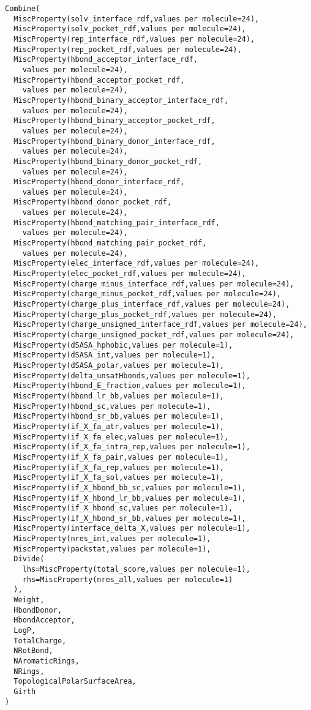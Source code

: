\begin{verbatim}
Combine(
  MiscProperty(solv_interface_rdf,values per molecule=24),
  MiscProperty(solv_pocket_rdf,values per molecule=24),
  MiscProperty(rep_interface_rdf,values per molecule=24),
  MiscProperty(rep_pocket_rdf,values per molecule=24),
  MiscProperty(hbond_acceptor_interface_rdf,
    values per molecule=24),
  MiscProperty(hbond_acceptor_pocket_rdf,
    values per molecule=24),
  MiscProperty(hbond_binary_acceptor_interface_rdf,
    values per molecule=24),
  MiscProperty(hbond_binary_acceptor_pocket_rdf,
    values per molecule=24),
  MiscProperty(hbond_binary_donor_interface_rdf,
    values per molecule=24),
  MiscProperty(hbond_binary_donor_pocket_rdf,
    values per molecule=24),
  MiscProperty(hbond_donor_interface_rdf,
    values per molecule=24),
  MiscProperty(hbond_donor_pocket_rdf,
    values per molecule=24),
  MiscProperty(hbond_matching_pair_interface_rdf,
    values per molecule=24),
  MiscProperty(hbond_matching_pair_pocket_rdf,
    values per molecule=24),
  MiscProperty(elec_interface_rdf,values per molecule=24),
  MiscProperty(elec_pocket_rdf,values per molecule=24),
  MiscProperty(charge_minus_interface_rdf,values per molecule=24),
  MiscProperty(charge_minus_pocket_rdf,values per molecule=24),
  MiscProperty(charge_plus_interface_rdf,values per molecule=24),
  MiscProperty(charge_plus_pocket_rdf,values per molecule=24),
  MiscProperty(charge_unsigned_interface_rdf,values per molecule=24),
  MiscProperty(charge_unsigned_pocket_rdf,values per molecule=24),
  MiscProperty(dSASA_hphobic,values per molecule=1),
  MiscProperty(dSASA_int,values per molecule=1),
  MiscProperty(dSASA_polar,values per molecule=1),
  MiscProperty(delta_unsatHbonds,values per molecule=1),
  MiscProperty(hbond_E_fraction,values per molecule=1),
  MiscProperty(hbond_lr_bb,values per molecule=1),
  MiscProperty(hbond_sc,values per molecule=1),
  MiscProperty(hbond_sr_bb,values per molecule=1),
  MiscProperty(if_X_fa_atr,values per molecule=1),
  MiscProperty(if_X_fa_elec,values per molecule=1),
  MiscProperty(if_X_fa_intra_rep,values per molecule=1),
  MiscProperty(if_X_fa_pair,values per molecule=1),
  MiscProperty(if_X_fa_rep,values per molecule=1),
  MiscProperty(if_X_fa_sol,values per molecule=1),
  MiscProperty(if_X_hbond_bb_sc,values per molecule=1),
  MiscProperty(if_X_hbond_lr_bb,values per molecule=1),
  MiscProperty(if_X_hbond_sc,values per molecule=1),
  MiscProperty(if_X_hbond_sr_bb,values per molecule=1),
  MiscProperty(interface_delta_X,values per molecule=1),
  MiscProperty(nres_int,values per molecule=1),
  MiscProperty(packstat,values per molecule=1),
  Divide(
    lhs=MiscProperty(total_score,values per molecule=1),
    rhs=MiscProperty(nres_all,values per molecule=1)
  ),
  Weight,
  HbondDonor,
  HbondAcceptor,
  LogP,
  TotalCharge,
  NRotBond,
  NAromaticRings,
  NRings,
  TopologicalPolarSurfaceArea,
  Girth
)
\end{verbatim}
\doublespace

